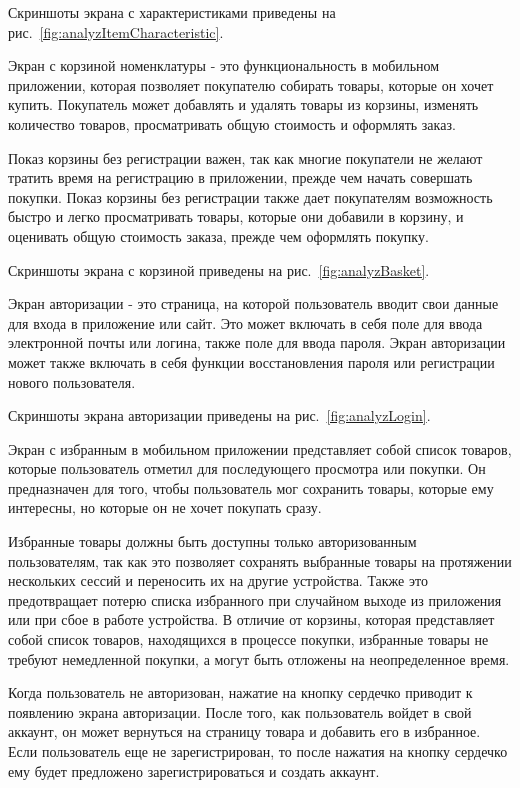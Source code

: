 Скриншоты экрана с характеристиками приведены на рис.~\ref{fig:analyzItemCharacteristic}.

Экран с корзиной номенклатуры - это функциональность в мобильном приложении,
которая позволяет покупателю собирать товары, которые он хочет купить.
Покупатель может добавлять и удалять товары из корзины, изменять количество товаров,
просматривать общую стоимость и оформлять заказ.

Показ корзины без регистрации важен,
так как многие покупатели не желают тратить время на регистрацию в приложении,
прежде чем начать совершать покупки.
Показ корзины без регистрации также дает покупателям возможность быстро и легко просматривать товары,
которые они добавили в корзину, и оценивать общую стоимость заказа, прежде чем оформлять покупку.

Скриншоты экрана с корзиной приведены на рис.~\ref{fig:analyzBasket}.

Экран авторизации - это страница, на которой пользователь вводит свои данные для входа
в приложение или сайт.
Это может включать в себя поле для ввода электронной почты или логина, 
 также поле для ввода пароля.
Экран авторизации может также включать в себя функции восстановления пароля
или регистрации нового пользователя. 

Скриншоты экрана авторизации приведены на рис.~\ref{fig:analyzLogin}.

Экран с избранным в мобильном приложении представляет собой список товаров,
которые пользователь отметил для последующего просмотра или покупки.
Он предназначен для того, чтобы пользователь мог сохранить товары, которые ему интересны,
но которые он не хочет покупать сразу.

Избранные товары должны быть доступны только авторизованным пользователям,
так как это позволяет сохранять выбранные товары на протяжении нескольких сессий
и переносить их на другие устройства.
Также это предотвращает потерю списка избранного при случайном выходе из приложения
или при сбое в работе устройства.
В отличие от корзины, которая представляет собой список товаров, находящихся в процессе покупки,
избранные товары не требуют немедленной покупки,
а могут быть отложены на неопределенное время.

Когда пользователь не авторизован, нажатие на кнопку сердечко приводит к появлению экрана авторизации.
После того, как пользователь войдет в свой аккаунт,
он может вернуться на страницу товара и добавить его в избранное.
Если пользователь еще не зарегистрирован,
то после нажатия на кнопку сердечко ему будет предложено зарегистрироваться и создать аккаунт.

